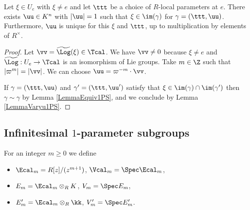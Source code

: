 \begin{lemma}
\notready\label{Lemma1PSgen} Let $\xi\in U_e$ with $\xi\ne e$ and let $\ttt$ be a choice of $R$-local parameters at $e$. There exists $\uu\in K^n$ with $|\uu|=1$ such that $\xi \in \im(\gamma)$ for $\gamma=(\ttt,\uu)$. Furthermore, $\uu$ is unique for this $\xi$ and $\ttt$, up to multiplication by elements of $R^\times$.
\end{lemma}
\begin{proof} Let $\vv=\widetilde{\Log}(\xi)\in \Tcal$. We have $\vv\ne 0$ because $\xi\ne e$ and $\widetilde{\Log}:U_e\to \Tcal$ is an isomorphism of Lie groups. Take $m\in \Z$ such that $|\varpi^m|=|\vv|$. We can choose $\uu=\varpi^{-m}\cdot \vv$.

If $\gamma=(\ttt,\uu)$ and $\gamma'=(\ttt,\uu')$ satisfy that $\xi\in \im(\gamma)\cap\im(\gamma')$ then $\gamma\sim\gamma$ by Lemma \ref{LemmaEquiv1PS}, and we conclude by Lemma \ref{LemmaVaryu1PS}.
\end{proof}
\subsection{Infinitesimal $1$-parameter subgroups} For an integer $m\ge 0$ we define
\begin{itemize}
\item $\Ecal_m= R[z]/(z^{m+1})$, $\Vcal_m=\Spec \Ecal_m$,
\item $E_m=\Ecal_m\otimes_R K$, $V_m=\Spec E_m$,
\item $E'_m=\Ecal_m\otimes_R \kk$, $V'_m=\Spec E'_m$.
\end{itemize}

